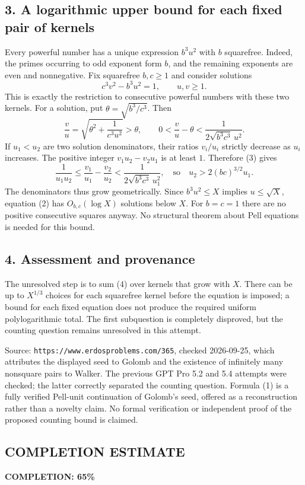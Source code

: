 \subsection*{3. A logarithmic upper bound for each fixed pair of kernels}
Every powerful number has a unique expression $b^3u^2$ with
$b$ squarefree. Indeed, the primes occurring to odd exponent form
$b$, and the remaining exponents are even and nonnegative.
Fix squarefree $b,c\ge1$ and consider solutions
\[
 c^3v^2-b^3u^2=1,\qquad u,v\ge1.                 \tag{2}
\]
This is exactly the restriction to consecutive powerful numbers
with these two kernels. For a solution, put
$\theta=\sqrt{b^3/c^3}$. Then
\[
 \frac vu=\sqrt{\theta^2+\frac1{c^3u^2}}>\theta,
 \qquad
 0<\frac vu-\theta
   <\frac1{2\sqrt{b^3c^3}\,u^2}.                 \tag{3}
\]
If $u_1<u_2$ are two solution denominators, their ratios $v_i/u_i$
strictly decrease as $u_i$ increases. The positive integer
$v_1u_2-v_2u_1$ is at least $1$. Therefore (3) gives
\[
 \frac1{u_1u_2}
 \le\frac{v_1}{u_1}-\frac{v_2}{u_2}
 <\frac1{2\sqrt{b^3c^3}\,u_1^2},
 \quad\text{so}\quad
 u_2>2(bc)^{3/2}u_1.                             \tag{4}
\]
The denominators thus grow geometrically. Since $b^3u^2\le X$ implies
$u\le\sqrt X$, equation (2) has $O_{b,c}(\log X)$ solutions below $X$.
For $b=c=1$ there are no positive consecutive squares anyway.
No structural theorem about Pell equations is needed for this bound.

\subsection*{4. Assessment and provenance}
The unresolved step is to sum (4) over kernels that grow with $X$.
There can be up to $X^{1/3}$ choices for each squarefree kernel
before the equation is imposed; a bound for each fixed equation
does not produce the required uniform polylogarithmic total.
The first subquestion is completely disproved, but the counting
question remains unresolved in this attempt.

Source: \texttt{https://www.erdosproblems.com/365}, checked 2026-09-25,
which attributes the displayed seed to Golomb and the existence of
infinitely many nonsquare pairs to Walker.
The previous GPT Pro 5.2 and 5.4 attempts were checked; the latter
correctly separated the counting question. Formula (1) is a fully
verified Pell-unit continuation of Golomb's seed, offered as a
reconstruction rather than a novelty claim. No formal verification
or independent proof of the proposed counting bound is claimed.
\subsection*{COMPLETION ESTIMATE}
\textbf{COMPLETION: 65\%}
